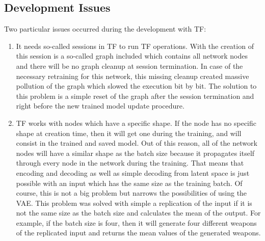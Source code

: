 \documentclass[MGS,Master,english]{twbook}%
\begin{document}
\subsection{Development Issues}
Two particular issues occurred during the development with TF:
\begin{enumerate}
	\item It needs so-called sessions in TF to run TF operations. With the creation of this session is a so-called graph included which contains all network nodes and there will be no graph cleanup at session termination. In case of the necessary retraining for this network, this missing cleanup created massive pollution of the graph which slowed the execution bit by bit. The solution to this problem is a simple reset of the graph after the session termination and right before the new trained model update procedure.
	\item TF works with nodes which have a specific shape. If the node has no specific shape at creation time, then it will get one during the training, and will consist in the trained and saved model. Out of this reason, all of the network nodes will have a similar shape as the batch size because it propagates itself through every node in the network during the training. That means that encoding and decoding as well as simple decoding from latent space is just possible with an input which has the same size as the training batch. Of course, this is not a big problem but narrows the possibilities of using the VAE. This problem was solved with simple a replication of the input if it is not the same size as the batch size and calculates the mean of the output. For example, if the batch size is four, then it will generate four different weapons of the replicated input and returns the mean values of the generated weapons.
\end{enumerate}
\end{document}
